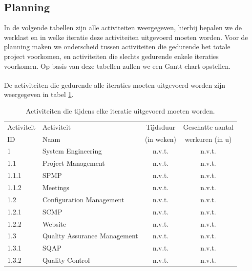 \subsection{Planning}
In de volgende tabellen zijn alle activiteiten weergegeven, hierbij bepalen we de werklast en in welke iteratie deze activiteiten uitgevoerd moeten worden. Voor de planning maken we onderscheid tussen activiteiten die gedurende het totale project voorkomen, en activiteiten die slechts gedurende enkele iteraties voorkomen. Op basis van deze tabellen zullen we een Gantt chart opstellen.
\\
\\
De activiteiten die gedurende alle iteraties moeten uitgevoerd worden zijn weergegeven in tabel \ref{tab:ActivitiesTotal}.
\begin{table}[H]
	\centering
	\caption{Activiteiten die tijdens elke iteratie uitgevoerd moeten worden.}
	\begin{tabular}{l|l|c|c}
		Activiteit & Activiteit & Tijdsduur & Geschatte aantal  \\
		ID & Naam & (in weken) & werkuren (in u) \\
		\hline
		1 	& System Engineering 		& n.v.t. & n.v.t.  \\
		1.1 & Project Management 		& n.v.t. & n.v.t.  \\
		1.1.1 & SPMP					& n.v.t. & n.v.t.  \\
		1.1.2 & Meetings				& n.v.t. & n.v.t.  \\
		1.2	& Configuration Management	& n.v.t. & n.v.t.  \\
		1.2.1 & SCMP  					& n.v.t. & n.v.t.  \\
		1.2.2 & Website					& n.v.t. & n.v.t.  \\
		1.3	& Quality Assurance Management & n.v.t. & n.v.t.  \\
		1.3.1 & SQAP					& n.v.t. & n.v.t.  \\
		1.3.2 & Quality Control			& n.v.t. & n.v.t.  \\
	\end{tabular}
	\label{tab:ActivitiesTotal}
\end{table}
